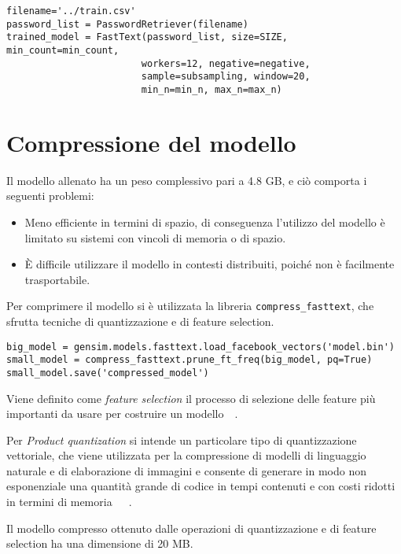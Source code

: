 \begin{verbatim}
filename='../train.csv'
password_list = PasswordRetriever(filename)
trained_model = FastText(password_list, size=SIZE, min_count=min_count,
                        workers=12, negative=negative,
                        sample=subsampling, window=20,
                        min_n=min_n, max_n=max_n)
\end{verbatim}

\section{Compressione del modello}
\label{sec:post-allenamento compressione modello}
Il modello allenato ha un peso complessivo pari a 4.8 GB, e ciò comporta i seguenti problemi:
\begin{itemize}
    \item Meno efficiente in termini di spazio, di conseguenza l'utilizzo del modello è limitato su sistemi con vincoli di memoria o di spazio.
    \item È difficile utilizzare il modello in contesti distribuiti, poiché non è facilmente trasportabile.
\end{itemize}
Per comprimere il modello si è utilizzata la libreria \texttt{compress\_fasttext}, che sfrutta tecniche di quantizzazione e di feature selection.~\cite{compress-fasttext}
\begin{verbatim}
big_model = gensim.models.fasttext.load_facebook_vectors('model.bin')
small_model = compress_fasttext.prune_ft_freq(big_model, pq=True)
small_model.save('compressed_model')
\end{verbatim}

Viene definito come \emph{feature selection} il processo di selezione delle feature più importanti da usare per costruire un modello~\cite{bishop2006pattern}~\cite{feature}.

Per \emph{Product quantization} si intende un particolare tipo di quantizzazione vettoriale, che viene utilizzata per la compressione di modelli di linguaggio naturale e di elaborazione di immagini e consente di generare in modo non esponenziale una quantità grande di codice in tempi contenuti e con costi ridotti in termini di memoria~\cite{biijeta}~\cite{compress-fasttext}~\cite{quantization}.

Il modello compresso ottenuto dalle operazioni di quantizzazione e di feature selection ha una dimensione di 20 MB.